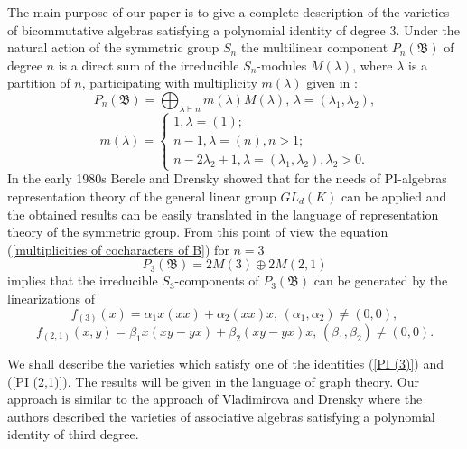 \documentclass{amsart}
\theoremstyle{definition}
\begin{document}
The main purpose of our paper is to give a complete description of the varieties of bicommutative algebras satisfying a polynomial identity of degree 3.
Under the natural action of the symmetric group $S_n$ the multilinear component $P_n({\mathfrak B})$ of degree $n$ is a direct sum of the irreducible $S_n$-modules $M(\lambda)$,
where $\lambda$ is a partition of $n$, participating with multiplicity $m(\lambda)$ given in \cite{DIT}:
\[
P_n({\mathfrak B})=\bigoplus_{\lambda\vdash n}m(\lambda)M(\lambda),\,\lambda=(\lambda_1,\lambda_2),
\]
\begin{equation}\label{multiplicities of cocharacters of B}
m(\lambda)=\begin{cases}
1,\lambda=(1);\\
n-1,\lambda=(n),n>1;\\
n-2\lambda_2+1, \lambda=(\lambda_1,\lambda_2), \lambda_2>0.
\end{cases}
\end{equation}
In the early 1980s Berele \cite{B} and Drensky \cite{Dr1} showed that for the needs of PI-algebras representation theory of the general linear group $GL_d(K)$
can be applied and the obtained results can be easily translated in the language of representation theory of the symmetric group.
From this point of view the equation (\ref{multiplicities of cocharacters of B}) for $n=3$
\begin{equation}\label{decomposition degree 3}
P_3({\mathfrak B})=2M(3)\oplus 2M(2,1)
\end{equation}
implies that the irreducible $S_3$-components of $P_3({\mathfrak B})$ can be generated by the linearizations of
\begin{equation}\label{PI (3)}
f_{(3)}(x)=\alpha_1 x(xx)+\alpha_2 (xx)x,\,(\alpha_1,\alpha_2)\not=(0,0),
\end{equation}
\begin{equation}\label{PI (2,1)}
f_{(2,1)}(x,y)=\beta_1x(xy-yx)+\beta_2(xy-yx)x,\,(\beta_1,\beta_2)\not=(0,0).
\end{equation}

We shall describe the varieties which satisfy one of the identities (\ref{PI (3)}) and (\ref{PI (2,1)}).
The results will be given in the language of graph theory. Our approach is similar to the approach of Vladimirova and Drensky \cite{VDr}
where the authors described the varieties of associative algebras satisfying a polynomial identity of third degree.
\end{document}
